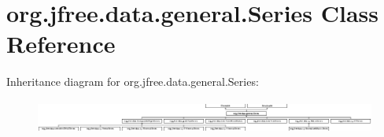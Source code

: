 \hypertarget{classorg_1_1jfree_1_1data_1_1general_1_1_series}{}\section{org.\+jfree.\+data.\+general.\+Series Class Reference}
\label{classorg_1_1jfree_1_1data_1_1general_1_1_series}
Inheritance diagram for org.\+jfree.\+data.\+general.\+Series\+:\begin{figure}[H]
\begin{center}
\leavevmode
\includegraphics[height=1.111111cm]{classorg_1_1jfree_1_1data_1_1general_1_1_series}
\end{center}
\end{figure}
